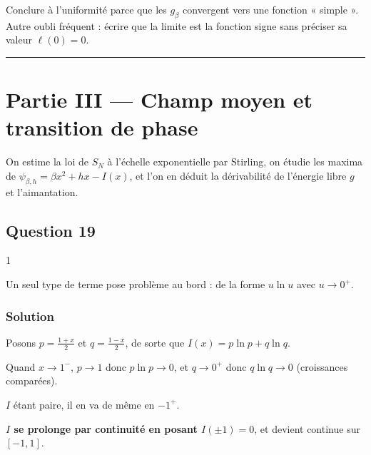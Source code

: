 \documentclass[11pt,a4paper]{article}
\begin{document}
\begin{piege}

Conclure à l'uniformité parce que les \(g_\beta\) convergent vers une fonction « simple ». Autre oubli fréquent : écrire que la limite est la fonction signe sans préciser sa valeur \(\ell(0)=0\).

\end{piege}

\begin{center}\rule{0.5\linewidth}{0.5pt}\end{center}

\hypertarget{partie-iii-champ-moyen-et-transition-de-phase}{%
\section{Partie III --- Champ moyen et transition de phase}\label{partie-iii-champ-moyen-et-transition-de-phase}}

On estime la loi de \(S_N\) à l'échelle exponentielle par Stirling, on étudie les maxima de \(\psi_{\beta,h}=\beta x^2+hx-I(x)\), et l'on en déduit la dérivabilité de l'énergie libre \(g\) et l'aimantation.

\hypertarget{question-19}{%
\subsection{Question 19}\label{question-19}}

\begin{indication}{1}

Un seul type de terme pose problème au bord : de la forme \(u\ln u\) avec \(u\to0^+\).

\end{indication}

\hypertarget{solution-18}{%
\subsubsection{Solution}\label{solution-18}}

Posons \(p=\frac{1+x}2\) et \(q=\frac{1-x}2\), de sorte que \(I(x)=p\ln p+q\ln q\).

Quand \(x\to1^-\), \(p\to1\) donc \(p\ln p\to0\), et \(q\to0^+\) donc \(q\ln q\to0\) (croissances comparées).

\(I\) étant paire, il en va de même en \(-1^+\).

\textbf{\(I\) se prolonge par continuité en posant \(I(\pm1)=0\)}, et devient continue sur \([-1,1]\).
\end{document}

